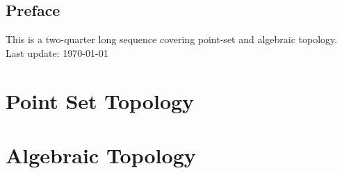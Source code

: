\documentclass[10pt,oneside,openany]{memoir}
\begin{document}
\chapter*{Preface}
\vspace{-35pt}
This is a two-quarter long sequence covering point-set and algebraic topology.
\vspace{-35pt}
\tableofcontents
\vfill
\specialdate
Last update: \today

%
\part{Point Set Topology}


\part{Algebraic Topology}


\end{document}
